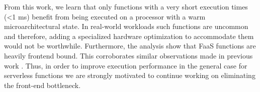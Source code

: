 \documentclass[../main.tex]{subfiles}
\begin{document}
\begin{refsection}[main-bib]

From this work, we learn that only functions with a very short
execution times (<1 ms) benefit from being executed on a processor
with a warm microarchitectural state. In real-world workloads such
functions are uncommon~\cite{shahrad20_server_wild,mahgoub22_wisef}
and therefore, adding a specialized hardware optimization to
accommodate them would not be worthwhile. Furthermore, the analysis
show that FaaS functions are heavily frontend bound. This corroborates
similar observations made in previous work
\cite{lukewarm_serverless,gan19_open_sourc_bench_suite_micros}. Thus,
in order to improve execution performance in the general case for
serverless functions we are strongly motivated to continue working on
eliminating the front-end bottleneck.


\end{refsection}
\end{document}
